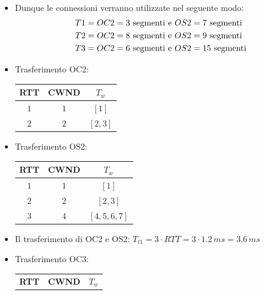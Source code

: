 \documentclass[10pt]{article}
\newcommand{\lightrule}{%
	\arrayrulecolor{black!30}%
	\midrule[\lightrulewidth]%
	\arrayrulecolor{black}}
\begin{document}
\begin{enumerate}
\begin{equation}
\begin{split}
			\end{split}
			\end{equation}
			\begin{itemize}
			\item Dunque le connessioni verranno utilizzate nel seguente modo:
			\begin{equation}
				\notag
				\begin{split}
				T1 & = OC2 = 3 \textrm{ segmenti e } OS2 = 7 \textrm{ segmenti} \\
				T2 & = OC2 = 8 \textrm{ segmenti e } OS2 = 9 \textrm{ segmenti} \\
				T3 & = OC2 = 6 \textrm{ segmenti e } OS2 = 15 \textrm{ segmenti} \\
				\end{split}
			\end{equation}
			\newpage
			\item Trasferimento OC2:
			\begin{center}
				\centering
 				\begin{tabular}{@{} *{3}{c} @{}}
 				\toprule
 					\textbf{RTT} & \textbf{CWND} & \textbf{$T_w$} \\
 				\midrule
 					$1$ & $1$ & $[1]$ \\ 
				\lightrule
 					$2$ & $2$ & $[2,3]$ \\
				\bottomrule
				\end{tabular}
			\end{center}
			\item Trasferimento OS2:
			\begin{center}
				\centering
 				\begin{tabular}{@{} *{3}{c} @{}}
 				\toprule
 					\textbf{RTT} & \textbf{CWND} & \textbf{$T_w$} \\
 				\midrule
 					$1$ & $1$ & $[1]$ \\ 
				\lightrule
 					$2$ & $2$ & $[2,3]$ \\
 				\lightrule
 					$3$ & $4$ & $[4,5,6,7]$ \\
				\bottomrule
				\end{tabular}
			\end{center}
			\smallskip
			\item Il trasferimento di OC2 e OS2: $T_{t1} = 3 \cdot RTT = 3 \cdot 1.2 \,ms = 3.6 \,ms$
			\item Trasferimento OC3:
			\begin{center}
				\centering
 				\begin{tabular}{@{} *{3}{c} @{}}
 				\toprule
 					\textbf{RTT} & \textbf{CWND} & \textbf{$T_w$} \\

\end{tabular}
\end{center}
\end{itemize}
\end{enumerate}
\end{document}
